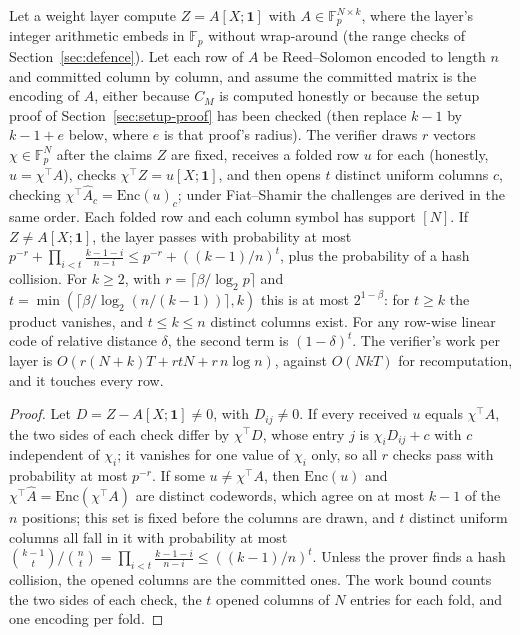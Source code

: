 \begin{proposition}
\label{prop:amp}
Let a weight layer compute $Z=A[X;\mathbf 1]$ with $A\in\mathbb F_p^{N\times k}$, where the layer's
integer arithmetic embeds in $\mathbb F_p$ without wrap-around (the range checks of
Section~\ref{sec:defence}). Let each row of $A$ be Reed--Solomon encoded to length $n$ and committed
column by column, and assume the committed matrix is the encoding of $A$, either because $C_M$ is
computed honestly or because the setup proof of Section~\ref{sec:setup-proof} has been checked (then
replace $k-1$ by $k-1+e$ below, where $e$ is that proof's radius). The verifier draws $r$ vectors
$\chi\in\mathbb F_p^N$ after the claims $Z$ are fixed, receives a folded row $u$ for each (honestly,
$u=\chi^{\top}\!A$), checks $\chi^{\top}Z=u[X;\mathbf 1]$, and then opens $t$ distinct uniform columns $c$, checking
$\chi^{\top}\hat A_c=\mathrm{Enc}(u)_c$; under Fiat--Shamir the challenges are derived in the same
order. Each folded row and each column symbol has support $[N]$. If $Z\neq A[X;\mathbf 1]$, the
layer passes with probability at most $p^{-r}+\prod_{i<t}\frac{k-1-i}{n-i}\le p^{-r}+((k-1)/n)^t$,
plus the probability of a hash collision. For $k\ge2$, with $r=\lceil\beta/\log_2p\rceil$ and
$t=\min(\lceil\beta/\log_2(n/(k-1))\rceil,k)$ this is at most $2^{1-\beta}$: for $t\ge k$ the
product vanishes, and $t\le k\le n$ distinct columns exist. For any row-wise linear code of relative distance $\delta$, the second term is
$(1-\delta)^t$. The verifier's work per layer is $O(r(N+k)T+rtN+r\,n\log n)$, against $O(NkT)$ for
recomputation, and it touches every row.
\end{proposition}
\begin{proof}
Let $D=Z-A[X;\mathbf 1]\neq0$, with $D_{ij}\neq0$. If every received $u$ equals $\chi^{\top}\!A$,
the two sides of each check differ by $\chi^{\top}D$, whose entry $j$ is $\chi_iD_{ij}+c$ with $c$
independent of $\chi_i$; it vanishes for one value of $\chi_i$ only, so all $r$ checks pass with
probability at most $p^{-r}$. If some $u\neq\chi^{\top}\!A$, then $\mathrm{Enc}(u)$ and
$\chi^{\top}\hat A=\mathrm{Enc}(\chi^{\top}\!A)$ are distinct codewords, which agree on at most
$k-1$ of the $n$ positions; this set is fixed before the columns are drawn, and $t$ distinct uniform
columns all fall in it with probability at most $\binom{k-1}{t}/\binom nt=\prod_{i<t}\frac{k-1-i}{n-i}\le((k-1)/n)^t$. Unless the prover finds a hash
collision, the opened columns are the committed ones. The work bound counts the two sides of each
check, the $t$ opened columns of $N$ entries for each fold, and one encoding per fold.
\end{proof}

